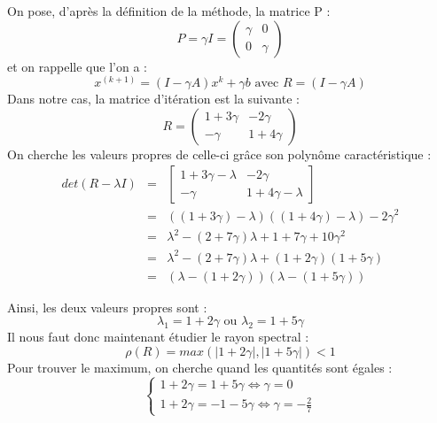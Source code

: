 On pose, d'après la définition de la méthode, la matrice P : 
\begin{equation}
P = \gamma I = 
\begin{pmatrix}
\gamma & 0 \\
0 & \gamma
\end{pmatrix}
\end{equation}
et on rappelle que l'on a : 
\begin{equation}
x^{(k+1)} = (I - \gamma A)x^{k} + \gamma b \text{ avec } R = (I - \gamma A)
\end{equation}
Dans notre cas, la matrice d'itération est la suivante : 
\begin{equation}
R = 
\begin{pmatrix}
1 + 3\gamma   & -2\gamma \\
-\gamma & 1+4\gamma
\end{pmatrix}
\end{equation}
On cherche les valeurs propres de celle-ci grâce son polynôme caractéristique : 
\begin{eqnarray}
det(R - \lambda I) &=& \begin{bmatrix}
1 + 3\gamma - \lambda   & -2\gamma \\
-\gamma & 1 + 4\gamma - \lambda
\end{bmatrix} \\
&=& ((1 + 3\gamma) - \lambda)((1 + 4\gamma) - \lambda) - 2\gamma^2\\
&=& \lambda^2 - (2 + 7\gamma)\lambda + 1 + 7\gamma + 10\gamma^2\\
&=& \lambda^2 - (2 + 7\gamma)\lambda + (1 + 2\gamma)(1 + 5\gamma)\\
&=& (\lambda - (1 + 2\gamma))(\lambda - (1 + 5\gamma))
\end{eqnarray}

Ainsi, les deux valeurs propres sont : 
\begin{equation}
\lambda_1 = 1 + 2\gamma \text{ ou } \lambda_2 = 1 + 5\gamma
\end{equation}
Il nous faut donc maintenant étudier le rayon spectral :
\begin{equation}
	\rho(R) = max(|1 + 2\gamma|,|1 + 5\gamma|) < 1
\end{equation}
Pour trouver le maximum, on cherche quand les quantités sont égales : 
\begin{equation}
\begin{cases}
1 + 2\gamma = 1+5\gamma \Leftrightarrow \gamma = 0\\
1 + 2\gamma = -1 - 5\gamma \Leftrightarrow \gamma = - \frac{2}{7}
\end{cases}
\end{equation}

